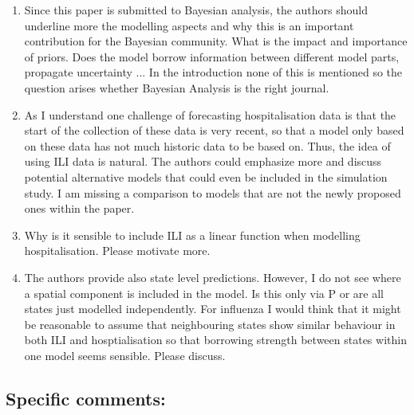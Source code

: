 \documentclass{article}
\begin{document}
\begin{enumerate}[1.]

\item Since this paper is submitted to Bayesian analysis, the authors should 
underline more the modelling aspects and why this is an important contribution 
for the Bayesian community. What is the impact and importance of priors. Does 
the model borrow information between different model parts, propagate 
uncertainty ... In the introduction none of this is mentioned so the question 
arises whether Bayesian Analysis is the right journal.

\item As I understand one challenge of forecasting hospitalisation data is that the 
start of the collection of these data is very recent, so that a model only 
based on these data has not much historic data to be based on. Thus, the idea 
of using ILI data is natural. The authors could emphasize more and discuss 
potential alternative models that could even be included in the simulation 
study. I am missing a comparison to models that are not the newly proposed 
ones within the paper.

\item Why is it sensible to include ILI as a linear function when modelling 
hospitalisation. Please motivate more. 

\item The authors provide also state level predictions. However, I do not see 
where a spatial component is included in the model. Is this only via P or are 
all states just modelled independently. For influenza I would think that it 
might be reasonable to assume that neighbouring states show similar behaviour 
in both ILI and hosptialisation so that borrowing strength between states 
within one model seems sensible. Please discuss.

\end{enumerate}


\subsection*{Specific comments:}
\end{document}
